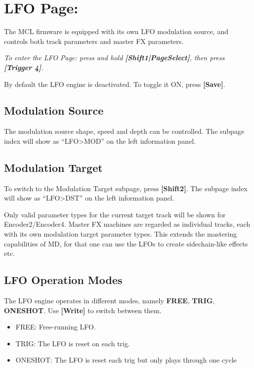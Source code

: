 \chapter{LFO Page:}
The MCL firmware is equipped with its own LFO modulation source, and controls both track parameters and master FX parameters.

\textit{To enter the LFO Page: press and hold \textbf{[Shift1|PageSelect]}, then press \textbf{[Trigger 4]}.}

By default the LFO engine is deactivated. To toggle it ON, press \textbf{[Save]}.


\section{Modulation Source}

The modulation source shape, speed and depth can be controlled. The subpage index will show as ``LFO>MOD'' on the left information panel.


\newpage


\section{Modulation Target}
To switch to the Modulation Target subpage, press \textbf{[Shift2]}. The subpage index will show as ``LFO>DST'' on the left information panel.


Only valid parameter types for the current target track will be shown for Encoder2/Encoder4. Master FX machines are regarded as individual tracks, each with its own modulation target parameter types. This extends the mastering capabilities of MD, for that one can use the LFOs to create sidechain-like effects etc.


\section{LFO Operation Modes}

The LFO engine operates in different modes, namely \textbf{FREE}, \textbf{TRIG}, \textbf{ONESHOT}. Use \textbf{[Write]} to switch between them.
\begin{itemize}
    \item FREE: Free-running LFO.
    \item TRIG: The LFO is reset on each trig.
    \item ONESHOT: The LFO is reset each trig but only plays through one cycle
\end{itemize}
